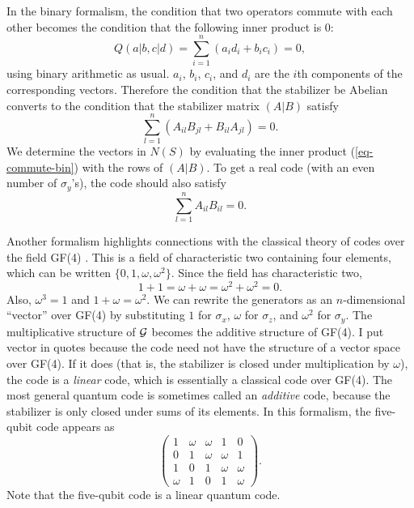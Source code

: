 \documentclass{report}
\newcommand{\G}{{\cal G}}
\newcommand{\X}{\sigma_x}
\newcommand{\Z}{\sigma_z}
\newcommand{\Y}{\sigma_y}
\newcommand{\Sum}{\sum}
\begin{document}
In the binary formalism, the condition that two operators commute with 
each other becomes the condition that the following inner product is 0:
\begin{equation}
Q(a|b, c|d) = \Sum_{i=1}^n (a_{i} d_{i} + b_{i} c_{i}) = 0,
\label{eq-commute-bin}
\end{equation}
using binary arithmetic as usual.  $a_i$, $b_i$, $c_i$, and $d_i$ are the 
$i$th components of the corresponding vectors.    Therefore the condition 
that the stabilizer be Abelian converts to the condition that the stabilizer 
matrix $(A|B)$ satisfy
\begin{equation}
\Sum_{l=1}^n (A_{il} B_{jl} + B_{il} A_{jl}) = 0.
\end{equation}
We determine the vectors in $N(S)$ by evaluating the inner product 
(\ref{eq-commute-bin}) with the rows of $(A|B)$.  To get a real code (with 
an even number of $\Y$'s), the code should also satisfy
\begin{equation}
\Sum_{l=1}^n A_{il} B_{il} = 0.
\end{equation}

Another formalism highlights connections with the classical theory of codes 
over the field GF(4) \cite{calderbank-GF4}.  This is a field of characteristic 
two containing four elements, which can be written 
$\{0, 1, \omega, \omega^2\}$.  Since the field has characteristic two, 
\begin{equation}
1 + 1 = \omega + \omega = \omega^2 + \omega^2 = 0.
\end{equation}
Also, $\omega^3 = 1$ and $1 + \omega = \omega^2$.  We can rewrite the 
generators as an $n$-dimensional ``vector'' over GF(4) by substituting $1$ 
for $\X$, $\omega$ for $\Z$, and $\omega^2$ for $\Y$.  The multiplicative 
structure of $\G$ becomes the additive structure of GF(4).  I put vector in 
quotes because the code need not have the structure of a vector space over 
GF(4).  If it does (that is, the stabilizer is closed under multiplication by 
$\omega$), the code is a {\em linear} code, which is essentially a classical 
code over GF(4).  The most general quantum code is sometimes called an {\em 
additive} code, because the stabilizer is only closed under sums of its elements.  In this formalism, the five-qubit code appears as
\begin{equation}
\left( \begin{array}{ccccc}
1 & \omega & \omega & 1 & 0 \\
0 & 1 & \omega & \omega & 1 \\
1 & 0 & 1 & \omega & \omega \\
\omega & 1 & 0 & 1 & \omega
\end{array} \right).
\end{equation}
Note that the five-qubit code is a linear quantum code.
\end{document}
